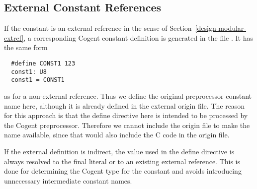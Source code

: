 \subsection{External Constant References}

If the constant  is an external reference in the sense of Section~\ref{design-modular-extref}, a corresponding
Cogent constant definition is generated in the file . It has the same form
\begin{verbatim}
  #define CONST1 123
  const1: U8
  const1 = CONST1
\end{verbatim}
as for a non-external reference. Thus we define the original preprocessor constant name  here, although
it is already defined in the external origin file. The reason for this approach is that the define directive here 
is intended to be processed by the Cogent preprocessor. Therefore we cannot include the origin file to make the name
available, since that would also include the C code in the origin file.

If the external definition is indirect, the value used in the define directive is always resolved to the final
literal or to an existing external reference. This is done for determining the Cogent type for the constant 
and avoids introducing unnecessary intermediate constant names.

